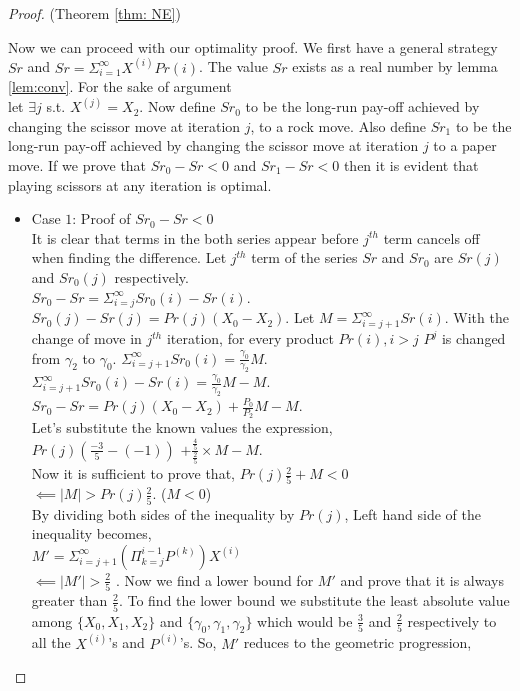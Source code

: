 \begin{proof}(Theorem \ref{thm: NE})
 
 
 Now we can proceed with our optimality proof. We first have a general strategy $Sr$ and $Sr=\Sigma_{i=1}^{\infty} X^{(i)}Pr(i)$. The value $Sr$ exists as a real number by lemma \ref{lem:conv}. For the sake of argument\\
 let  $\exists j $ s.t. $X^{(j)}=X_2$. Now define $Sr_0$ to be the long-run pay-off achieved by changing the scissor move at iteration $j$, to a rock move. Also define  $Sr_1$ to be the long-run pay-off achieved by changing the scissor move at iteration $j$ to a paper move. If we prove that $Sr_0-Sr<0$ and $Sr_1-Sr<0$ then it is evident that playing scissors at any iteration is optimal.\\
 
 \begin{itemize}
 	\item Case $1$: Proof of $Sr_0-Sr<0$\\
 	It is clear that terms in the both series appear before $j^{th}$ term cancels off when finding the difference. Let $j^{th}$ term of the series $Sr$ and $Sr_0$ are $Sr(j)$ and $Sr_0(j)$ respectively.\\
 	$Sr_0-Sr=\Sigma_{i=j}^{\infty} Sr_0(i) - Sr(i)$.\\
 	$Sr_0(j) - Sr(j)=Pr(j)(X_0-X_2)$. Let $M=\Sigma_{i=j+1}^{\infty}Sr(i)$. With the change of move in $j^{th}$ iteration, for every product $Pr(i), i > j$ $P^{j}$ is changed from $\gamma_2$ to $\gamma_0$. $\Sigma_{i=j+1}^{\infty}Sr_0(i)= \frac{\gamma_0}{\gamma_2}M$.\\
 	$\Sigma_{i=j+1}^{\infty} Sr_0(i) - Sr(i)=\frac{\gamma_0}{\gamma_2}M-M$.\\
 	$Sr_0-Sr=Pr(j)(X_0-X_2)+\frac{P_0}{P_2}M-M$.\\
 	Let's substitute the known values the expression,\\
 	$Pr(j)(\frac{-3}{5} - (-1))$ $+ \frac{\frac{4}{5}}{\frac{2}{5}}\times M - M$.\\
 	Now it is sufficient to prove that,
 	$Pr(j)\frac{2}{5} + M < 0$\\
 	$\impliedby |M| > Pr(j)\frac{2}{5}$. ($M < 0$)\\
 	By dividing both sides of the inequality by $Pr(j)$, Left hand side of the inequality becomes,\\
 	$M'=\Sigma_{i=j+1}^{\infty} (\Pi_{k=j}^{i-1}P^{(k)})X^{(i)}$ \\
 	$\impliedby |M'| > \frac{2}{5}$ . Now we find a lower bound for $M'$ and prove that it is always greater than $\frac{2}{5}$.  To find the lower bound we substitute the least absolute value among $\{X_0,X_1,X_2\}$ and $\{\gamma_0,\gamma_1,\gamma_2\}$ which would be  	$\frac{3}{5}$ and $\frac{2}{5}$ respectively to all the $X^{(i)}$'s and $P^{(i)}$'s. So, $M'$ reduces to the geometric progression,\\

\end{itemize}
\end{proof}

